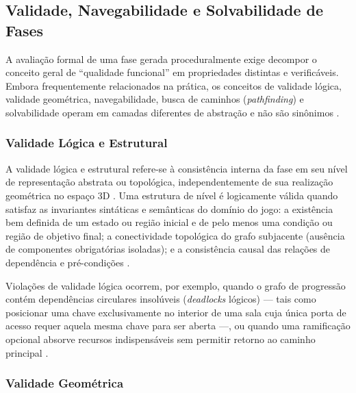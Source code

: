 \subsection{Validade, Navegabilidade e Solvabilidade de Fases}
\label{sec:validade_navegabilidade_solvabilidade}

A avaliação formal de uma fase gerada proceduralmente exige decompor o conceito geral de ``qualidade funcional'' em propriedades distintas e verificáveis. Embora frequentemente relacionados na prática, os conceitos de validade lógica, validade geométrica, navegabilidade, busca de caminhos (\textit{pathfinding}) e solvabilidade operam em camadas diferentes de abstração e não são sinônimos \cite{dormans2010, inproceedings, linden2014dungeons, sun2024roomplanner, xu2025constraint}.

\subsubsection{Validade Lógica e Estrutural}
\label{sec:validade_logica}

A validade lógica e estrutural refere-se à consistência interna da fase em seu nível de representação abstrata ou topológica, independentemente de sua realização geométrica no espaço 3D \cite{dormans2010, inproceedings, linden2014dungeons}. Uma estrutura de nível é logicamente válida quando satisfaz as invariantes sintáticas e semânticas do domínio do jogo: a existência bem definida de um estado ou região inicial e de pelo menos uma condição ou região de objetivo final; a conectividade topológica do grafo subjacente (ausência de componentes obrigatórias isoladas); e a consistência causal das relações de dependência e pré-condições \cite{dormans2010, inproceedings, xu2025databasedrivenframework3dlevel}.

Violações de validade lógica ocorrem, por exemplo, quando o grafo de progressão contém dependências circulares insolúveis (\textit{deadlocks} lógicos) --- tais como posicionar uma chave exclusivamente no interior de uma sala cuja única porta de acesso requer aquela mesma chave para ser aberta ---, ou quando uma ramificação opcional absorve recursos indispensáveis sem permitir retorno ao caminho principal \cite{dormans2010, linden2014dungeons, xu2025databasedrivenframework3dlevel}.

\subsubsection{Validade Geométrica}
\label{sec:validade_geometrica}

